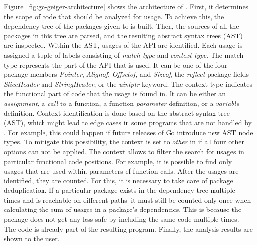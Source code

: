 Figure~\ref{fig:go-geiger-architecture} shows the architecture of \toolGeiger{}.
First, it determines the scope of code that should be analyzed for \unsafe{} usage.
To achieve this, the dependency tree of the packages given to \toolGeiger{} is built.
Then, the sources of all the packages in this tree are parsed, and the resulting abstract syntax trees (\acrshort{AST})
are inspected.
Within the \acrshort{AST}, usages of the \unsafe{} \acrshort{API} are identified.
Each usage is assigned a tuple of labels consisting of \textit{match type} and \textit{context type}.
The match type represents the part of the \unsafe{} \acrshort{API} that is used.
It can be one of the four \unsafe{} package members \textit{Pointer}, \textit{Alignof}, \textit{Offsetof}, and
\textit{Sizeof}, the \textit{reflect} package fields \textit{SliceHeader} and \textit{StringHeader}, or the
\textit{uintptr} keyword.
The context type indicates the functional part of code that the usage is found in.
It can be either an \textit{assignment}, a \textit{call} to a function, a function \textit{parameter} definition, or a
\textit{variable} definition.
Context identification is done based on the abstract syntax tree (\acrshort{AST}), which might lead to edge cases in
some programs that are not handled by \toolGeiger{}.
For example, this could happen if future releases of Go introduce new \acrshort{AST} node types.
To mitigate this possibility, the context is set to \textit{other} in \toolGeiger{} if all four other options can not be
applied.
The context allows to filter the search for \unsafe{} usages in particular functional code positions.
For example, it is possible to find only \unsafe{} usages that are used within parameters of function calls.
After the \unsafe{} usages are identified, they are counted.
For this, it is necessary to take care of package deduplication.
If a particular package exists in the dependency tree multiple times and is reachable on different paths, it must still
be counted only once when calculating the sum of \unsafe{} usages in a package's dependencies.
This is because the package does not get any less safe by including the same code multiple times.
The code is already part of the resulting program.
Finally, the analysis results are shown to the user.



